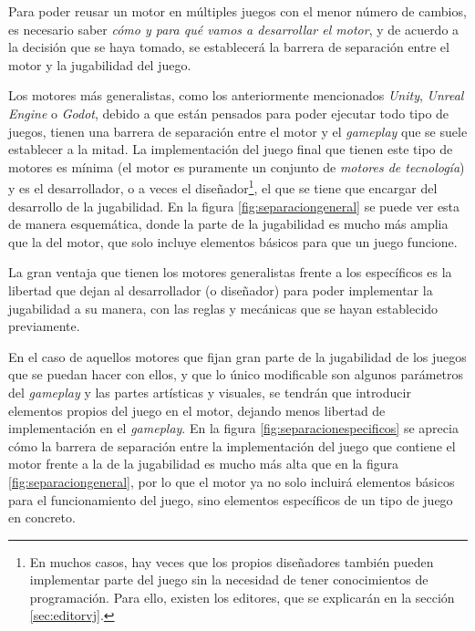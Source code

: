 Para poder reusar un motor en múltiples juegos con el menor número de cambios, es necesario saber \textit{cómo y para qué vamos a desarrollar el motor}, y de acuerdo a la decisión que se haya tomado, se establecerá la barrera de separación entre el motor y la jugabilidad del juego.

\medskip

Los motores más generalistas, como los anteriormente mencionados \textit{Unity}, \textit{Unreal Engine} o \textit{Godot}, debido a que están pensados para poder ejecutar todo tipo de juegos, tienen una barrera de separación entre el motor y el \textit{gameplay} que se suele establecer a la mitad. La implementación del juego final que tienen este tipo de motores es mínima (el motor es puramente un conjunto de \textit{motores de tecnología}) y es el desarrollador, o a veces el diseñador\footnote{En muchos casos, hay veces que los propios diseñadores también pueden implementar parte del juego sin la necesidad de tener conocimientos de programación. Para ello, existen los editores, que se explicarán en la sección \ref{sec:editorvj}.}, el que se tiene que encargar del desarrollo de la jugabilidad. En la figura \ref{fig:separaciongeneral} se puede ver esta  de manera esquemática, donde la parte de la jugabilidad es mucho más amplia que la del motor, que solo incluye elementos básicos para que un juego funcione. 

\smallskip

La gran ventaja que tienen los motores generalistas frente a los específicos es la libertad que dejan al desarrollador (o diseñador) para poder implementar la jugabilidad a su manera, con las reglas y mecánicas que se hayan establecido previamente.

\medskip

En el caso de aquellos motores que fijan gran parte de la jugabilidad de los juegos que se puedan hacer con ellos, y que lo único modificable son algunos parámetros del \textit{gameplay} y las partes artísticas y visuales, se tendrán que introducir elementos propios del juego en el motor, dejando menos libertad de implementación en el \textit{gameplay}. En la figura \ref{fig:separacionespecificos} se aprecia cómo la barrera de separación entre la implementación del juego que contiene el motor frente a la de la jugabilidad es mucho más alta que en la figura \ref{fig:separaciongeneral}, por lo que el motor ya no solo incluirá elementos básicos para el funcionamiento del juego, sino elementos específicos de un tipo de juego en concreto.

